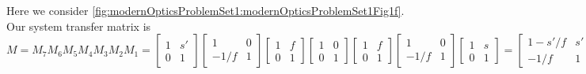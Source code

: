 {\begin{enumerate}
Here we consider \cref{fig:modernOpticsProblemSet1:modernOpticsProblemSet1Fig1f}.
%
%
Our system transfer matrix is
%
\begin{dmath}\label{eqn:modernOpticsProblemSet1P1:1730}
M =
M_7
M_6
M_5
M_4
M_3
M_2
M_1
=
\begin{bmatrix}
1 & s' \\
0 & 1
\end{bmatrix}
\begin{bmatrix}
1 & 0 \\
-1/f & 1
\end{bmatrix}
\begin{bmatrix}
1 & f \\
0 & 1
\end{bmatrix}
\begin{bmatrix}
1 & 0 \\
0 & 1
\end{bmatrix}
\begin{bmatrix}
1 & f \\
0 & 1
\end{bmatrix}
\begin{bmatrix}
1 & 0 \\
-1/f & 1
\end{bmatrix}
\begin{bmatrix}
1 & s \\
0 & 1
\end{bmatrix}
=
\begin{bmatrix}
1 - s'/f & s' \\
-1/f & 1
\end{bmatrix}
\begin{bmatrix}
1 & 2 f \\
0 & 1
\end{bmatrix}
\begin{bmatrix}
1 & s \\
-1/f & -s/f + 1
\end{bmatrix}
=
\begin{bmatrix}
1 - s'/f & 2f - s' \\
-1/f & -1
\end{bmatrix}
\begin{bmatrix}
1 & s \\
-1/f & -s/f + 1
\end{bmatrix}
=
\begin{bmatrix}
-1 & 2 f - s' -s \\
0 & -1
\end{bmatrix}

\end{dmath}
\end{enumerate}}
